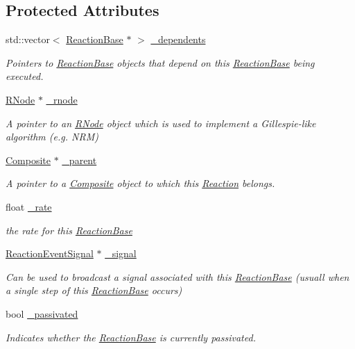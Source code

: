 \subsection*{Protected Attributes}
\begin{DoxyCompactItemize}
\item 
std\-::vector$<$ \hyperlink{classchem_1_1ReactionBase}{Reaction\-Base} $\ast$ $>$ \hyperlink{classchem_1_1ReactionBase_a04cda0098d19b2b4a68a6c413c97ed96}{\-\_\-dependents}
\begin{DoxyCompactList}\small\item\em Pointers to \hyperlink{classchem_1_1ReactionBase}{Reaction\-Base} objects that depend on this \hyperlink{classchem_1_1ReactionBase}{Reaction\-Base} being executed. \end{DoxyCompactList}\item 
\hyperlink{classchem_1_1RNode}{R\-Node} $\ast$ \hyperlink{classchem_1_1ReactionBase_aedaf23c8b9f80598fc68f715309a6aa3}{\-\_\-rnode}
\begin{DoxyCompactList}\small\item\em A pointer to an \hyperlink{classchem_1_1RNode}{R\-Node} object which is used to implement a Gillespie-\/like algorithm (e.\-g. N\-R\-M) \end{DoxyCompactList}\item 
\hyperlink{classchem_1_1Composite}{Composite} $\ast$ \hyperlink{classchem_1_1ReactionBase_a662547106ad4d617495099e9fd85cc06}{\-\_\-parent}
\begin{DoxyCompactList}\small\item\em A pointer to a \hyperlink{classchem_1_1Composite}{Composite} object to which this \hyperlink{classchem_1_1Reaction}{Reaction} belongs. \end{DoxyCompactList}\item 
float \hyperlink{classchem_1_1ReactionBase_a787107879dc2a24b789997bac1eb1634}{\-\_\-rate}
\begin{DoxyCompactList}\small\item\em the rate for this \hyperlink{classchem_1_1ReactionBase}{Reaction\-Base} \end{DoxyCompactList}\item 
\hyperlink{namespacechem_a40bfcc5c8ae87e2713c68fae68215991}{Reaction\-Event\-Signal} $\ast$ \hyperlink{classchem_1_1ReactionBase_adad4289e6bbe5550c0d75a506bdc88ab}{\-\_\-signal}
\begin{DoxyCompactList}\small\item\em Can be used to broadcast a signal associated with this \hyperlink{classchem_1_1ReactionBase}{Reaction\-Base} (usuall when a single step of this \hyperlink{classchem_1_1ReactionBase}{Reaction\-Base} occurs) \end{DoxyCompactList}\item 
bool \hyperlink{classchem_1_1ReactionBase_a757ed91c018c8fa643472860df309804}{\-\_\-passivated}
\begin{DoxyCompactList}\small\item\em Indicates whether the \hyperlink{classchem_1_1ReactionBase}{Reaction\-Base} is currently passivated. \end{DoxyCompactList}\end{DoxyCompactItemize}
